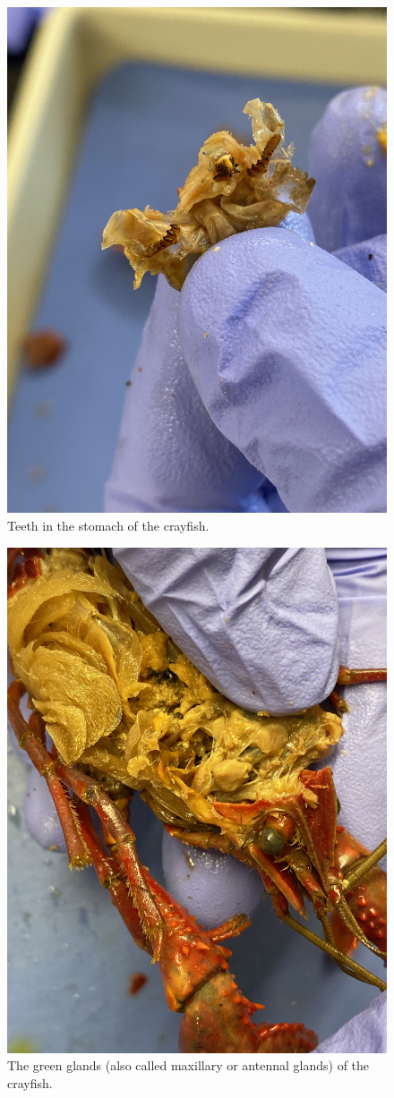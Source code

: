 \begin{figure}

{\centering \includegraphics[width=0.7\linewidth]{./figures/nematoda/crayfish_teeth} 

}

\caption{Teeth in the stomach of the crayfish.}\label{fig:teeth}
\end{figure}

\begin{figure}

{\centering \includegraphics[width=0.7\linewidth]{./figures/nematoda/crayfish_green_gland} 

}

\caption{The green glands (also called maxillary or antennal glands) of the crayfish.}\label{fig:gland}
\end{figure}

